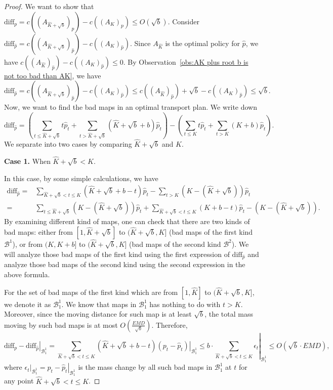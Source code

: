 \begin{proof}
    We want to show that $\text{diff}_p = c((A_{\hat{K}+\sqrt{b}})_p) - c((A_K)_p) \leq O(\sqrt{b})$. Consider $\text{diff}_{\hat{p}} = c((A_{\hat{K}+\sqrt{b}})_{\hat{p}}) - c((A_K)_{\hat{p}})$. Since $A_{\hat{K}}$ is the optimal policy for $\hat{p}$, we have $c((A_{\hat{K}})_{\hat{p}}) - c((A_K)_{\hat{p}}) \leq 0$. By Observation~\ref{obs:AK plus root b is not too bad than AK}, we have 
    \[\text{diff}_{\hat{p}} = c((A_{\hat{K}+\sqrt{b}})_{\hat{p}}) - c((A_K)_{\hat{p}}) \leq c((A_{\hat{K}})_{\hat{p}}) + \sqrt{b}- c((A_K)_{\hat{p}}) \leq \sqrt{b}.\]
    Now, we want to find the bad maps in an optimal transport plan. We write down
    \[\text{diff}_{\hat{p}} = \left( \sum_{t \leq \hat{K}+\sqrt{b}} t \hat{p}_t + \sum_{t>\hat{K}+\sqrt{b}}(\hat{K}+\sqrt{b}+b)\hat{p}_t \right) - \left( \sum_{t \leq K} t \hat{p}_t + \sum_{t>K}(K+b)\hat{p}_t \right).\]
    We separate into two cases by comparing $\hat{K}+\sqrt{b}$ and $K$.

    \textbf{Case 1.} When $\hat{K}+\sqrt{b} < K$.

    In this case, by some simple calculations, we have 
    \begin{align*}
    \text{diff}_{\hat{p}} =& \sum_{\hat{K}+\sqrt{b}< t \leq K}(\hat{K}+\sqrt{b}+b-t)\hat{p}_t - \sum_{t > K}(K-(\hat{K}+\sqrt{b}))\hat{p}_t\\
    =& \sum_{t \leq \hat{K}+\sqrt{b}}(K-(\hat{K}+\sqrt{b}))\hat{p}_t + \sum_{\hat{K}+\sqrt{b}< t \leq K}(K+b-t)\hat{p}_t - (K-(\hat{K}+\sqrt{b})).
    \end{align*}
    By examining different kind of maps, one can check that there are two kinds of bad maps: either from $[1,\hat{K}+\sqrt{b}]$ to $(\hat{K}+\sqrt{b},K]$ (bad maps of the first kind $\mathcal{B}^1$), or from $(K,K+b]$ to $(\hat{K}+\sqrt{b},K]$ (bad maps of the second kind $\mathcal{B}^2$). We will analyze those bad maps of the first kind using the first expression of $\text{diff}_{\hat{p}}$ and analyze those bad maps of the second kind using the second expression in the above formula.

    For the set of bad maps of the first kind which are from $[1,\hat{K}]$ to $(\hat{K}+\sqrt{b},K]$, we denote it as $\mathcal{B}^1_1$. We know that maps in $\mathcal{B}^1_1$ has nothing to do with $t>K$. Moreover, since the moving distance for such map is at least $\sqrt{b}$, the total mass moving by such bad maps is at most $O(\frac{EMD}{\sqrt{b}})$. Therefore,
    $$\left. \text{diff}_p - \text{diff}_{\hat{p}}\right|_{\mathcal{B}^1_1} = \sum_{\hat{K}+\sqrt{b}< t \leq K}(\hat{K}+\sqrt{b}+b-t)\left.(p_t-\hat{p}_t) \right|_{\mathcal{B}^1_1} \leq b \cdot  \left. \sum_{ \hat{K}+\sqrt{b}<t \leq K} \epsilon_t \right|_{\mathcal{B}^1_1} \leq O(\sqrt{b}\cdot EMD),$$
    where $\left. \epsilon_t \right|_{\mathcal{B}^1_1} = \left. p_t - \hat{p}_t \right|_{\mathcal{B}^1_1}$ is the mass change by all such bad maps in $\mathcal{B}^1_1$ at $t$ for any point $\hat{K}+\sqrt{b}<t \leq K$.


\end{proof}
